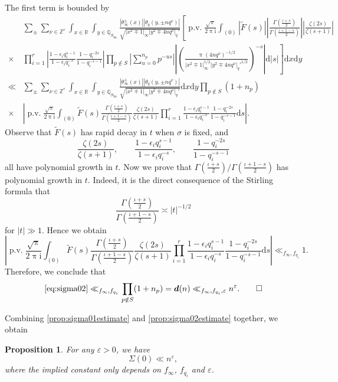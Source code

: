 \documentclass[10pt,oneside,reqno]{amsart}
\makeatletter
\newcommand\rmd{\mathrm{d}}
\newcommand\rmi{\mathrm{i}}
\newcommand\QQ{\mathbb{Q}}
\newcommand\RR{\mathbb{R}}
\newcommand\ZZ{\mathbb{Z}}
\newcommand\dpii{2\uppi\rmi}
\DeclareMathOperator\pv{p.v.}
\newcommand\fin{\mathrm{fin}}
\newcommand\legendresymbol[2]{\genfrac{(}{)}{}{}{#1}{#2}}
\theoremstyle{THEOREM}
\newtheorem{proposition}[theorem]{Proposition}
\theoremstyle{DEFINITION}
\theoremstyle{EXERCISE}
\numberwithin{equation}{section}
\renewenvironment{proof}[1][\proofname]{\par
  \vspace{-6pt}
  \pushQED{\qed}
  \normalfont \topsep6\p@\@plus6\p@\relax
  \trivlist
  \item[\hskip\labelsep\rmfamily\bfseries
    #1\@addpunct{:}]\ignorespaces
}{
  \popQED\endtrivlist\@endpefalse
  \vspace{-6pt}
}
\makeatother
\begin{document}
\begin{proof}
The first term is bounded by
\begin{align*}
  & \sum_{\pm}\sum_{\nu\in \ZZ^r}\int_{x\in \RR}\int_{y\in \QQ_{S_\fin}}\frac{|\theta_\infty^\pm(x)||\theta_{q}(y,\pm nq^\nu)|}{\sqrt{|x^2\mp 1|_\infty|y^2\mp 4nq^\nu|_q'}}\left[\pv\frac{\sqrt{\uppi}}{\dpii}\int_{(0)}|\widetilde{F}(s)| \left|\frac{\Gamma(\frac{\iota+s}{2})}{\Gamma(\frac{\iota+1-s}{2})}\right|\left|\frac{\zeta(2s)}{\zeta(s+1)}\right| \right.\\
  \times&\left. \prod_{i=1}^{r}\left|\frac{1-\epsilon_i q_i^{s-1}}{1-\epsilon_i q_i^{-s}}\frac{1-q_i^{-2s}}{1-q_i^{-s-1}}\right|\prod_{p\notin S}\left|\sum_{u=0}^{n_p}p^{-us}\right|\left|\legendresymbol{\uppi (4nq^\nu)^{-1/2}}{|x^2\mp 1|_\infty^{1/2}|y^2\mp 4nq^\nu|_q'^{1/2}}^{-s}\right|\rmd |s|\right]
  \rmd x\rmd y\\
  \ll &\sum_{\pm}\sum_{\nu\in \ZZ^r}\int_{x\in \RR}\int_{y\in \QQ_{S_\fin}}\frac{|\theta_\infty^\pm(x)||\theta_{q}(y,\pm nq^\nu)|}{\sqrt{|x^2\mp 1|_\infty|y^2\mp 4nq^\nu|_q'}}\rmd x\rmd y\prod_{p\notin S}(1+n_p) \\
  \times&\left|\pv\frac{\sqrt{\uppi}}{\dpii}\int_{(0)}\widetilde{F}(s) \frac{\Gamma(\frac{\iota+s}{2})}{\Gamma(\frac{\iota+1-s}{2})}\frac{\zeta(2s)}{\zeta(s+1)} \prod_{i=1}^{r}\frac{1-\epsilon_i q_i^{s-1}}{1-\epsilon_i q_i^{-s}}\frac{1-q_i^{-2s}}{1-q_i^{-s-1}}\rmd s\right|.
\end{align*}
Observe that $\widetilde{F}(s)$ has rapid decay in $t$ when $\sigma$ is fixed, and
\[
\frac{\zeta(2s)}{\zeta(s+1)},\qquad \frac{1-\epsilon_i q_i^{s-1}}{1-\epsilon_i q_i^{-s}},\qquad \frac{1-q_i^{-2s}}{1-q_i^{-s-1}}
\]
all have polynomial growth in $t$. Now we prove that $\Gamma(\frac{\iota+s}{2})/\Gamma(\frac{\iota+1-s}{2})$ has polynomial growth in $t$. Indeed, it is the direct consequence of the Stirling formula \cite[Chapter II.0]{tenenbaum2015analytic} that
\[
\frac{\Gamma(\frac{\iota+s}{2})}{\Gamma(\frac{\iota+1-s}{2})}\asymp |t|^{-1/2}
\]
for $|t|\gg 1$. Hence we obtain
\[
\left|\pv\frac{\sqrt{\uppi}}{\dpii}\int_{(0)}\widetilde{F}(s) \frac{\Gamma(\frac{\iota+s}{2})}{\Gamma(\frac{\iota+1-s}{2})}\frac{\zeta(2s)}{\zeta(s+1)} \prod_{i=1}^{r}\frac{1-\epsilon_i q_i^{s-1}}{1-\epsilon_i q_i^{-s}}\frac{1-q_i^{-2s}}{1-q_i^{-s-1}}\rmd s\right|\ll_{f_\infty,f_{q_i}} 1.
\]
Therefore, we conclude that 
\[
\eqref{eq:sigma02}\ll_{f_\infty,f_{q_i}} \prod_{p\notin S}(1+n_p)=\bm{d}(n)\ll_{f_\infty,f_{q_i},\varepsilon} n^\varepsilon.\qedhere
\]
\end{proof}

Combining \autoref{prop:sigma01estimate} and \autoref{prop:sigma02estimate} together, we obtain
\begin{proposition}\label{prop:estimatesigma0}
For any $\varepsilon>0$, we have
\[
\Sigma(0)\ll n^\varepsilon,
\]
where the implied constant only depends on $f_\infty$, $f_{q_i}$ and $\varepsilon$.
\end{proposition}
\end{document}
